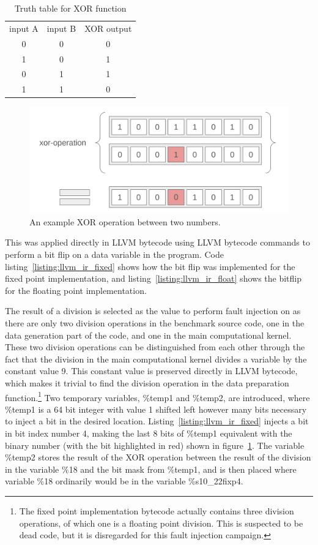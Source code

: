 \begin{table}[htb]
    \centering
\caption{Truth table for XOR function}
    \label{table:xor_truth_table}
\begin{tabular}{c|c|c}
     input A& input B& XOR output \\
     0&0&0\\
     1&0&1\\
     0&1&1\\
     1&1&0
\end{tabular}
    
\end{table}



\begin{figure}[h!]
    \centering
    \includegraphics[width=0.75\linewidth]{Images/xor_operation.png}
    \caption{An example XOR operation between two numbers.}
    \label{fig:xor_operation}
\end{figure}

This was applied directly in LLVM bytecode using LLVM bytecode commands to perform a bit flip on a data variable in the program. Code listing~\ref{listing:llvm_ir_fixed} shows how the bit flip was implemented for the fixed point implementation, and listing~\ref{listing:llvm_ir_float} shows the bitflip for the floating point implementation.



The result of a division is selected as the value to perform fault injection on as there are only two division operations in the benchmark source code, one in the data generation part of the code, and one in the main computational kernel. These two division operations can be distinguished from each other through the fact that the division in the main computational kernel divides a variable by the constant value 9. This constant value is preserved directly in LLVM bytecode, which makes it trivial to find the division operation in the data preparation function.\footnote{The fixed point implementation bytecode actually contains three division operations, of which one is a floating point division. This is suspected to be dead code, but it is disregarded for this fault injection campaign.}
Two temporary variables, \%temp1 and \%temp2, are introduced, where \%temp1 is a 64 bit integer with value 1 shifted left however many bits necessary to inject a bit in the desired location. Listing~\ref{listing:llvm_ir_fixed} injects a bit in bit index number 4, making the last 8 bits of \%temp1 equivalent with the binary number (with the bit highlighted in red) shown in figure~\ref{fig:xor_operation}.
The variable \%temp2 stores the result of the XOR operation between the result of the division in the variable \%18 and the bit mask from \%temp1, and is then placed where variable \%18 ordinarily would be in the variable \%s10\_22fixp4.

